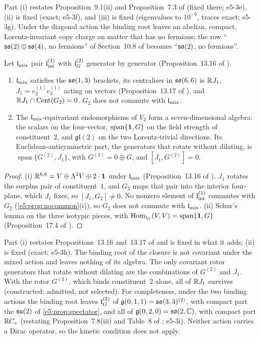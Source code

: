 Part (i) restates Proposition~9.1(ii) and Proposition~7.3 of \cite{RE} (fixed there; e5-3e), (ii) is fixed (exact; e5-3f), and (iii) is fixed
(eigenvalues to $10^{-9}$, traces exact; e5-3g). Under the diagonal action the binding root leaves an abelian, compact, Lorentz-invariant copy charge
on matter that has no fermions; the row ``$\mathfrak{so}(2)\oplus\mathfrak{so}(4)$, no fermions'' of Section~10.8 of \cite{ES17} becomes ``$\mathfrak{so}(2)$, no fermions''.

\begin{proposition}
\label{e5:prop:mixed}
Let $\mathfrak l_{\rm mix}$ pair $\mathfrak l_{\rm int}^{(1)}$ with $\mathfrak l_G^{(2)}$ generator by generator (Proposition~13.16 of \cite{ES17}).
\begin{enumerate}[label=(\roman*),leftmargin=2.2em]
\item $\mathfrak l_{\rm mix}$ satisfies the $\mathfrak{so}(1,3)$ brackets, its centraliser in $\mathfrak{so}(6,6)$ is $\mathbb{R} J_1$, $J_1=e^{(1)}_2e^{(1)}_3$ acting on vectors
(Proposition~13.17 of \cite{ES17}), and $\mathbb{R} J_1\cap\operatorname{Cent}(G_2)=0$. $G_2$ does not commute with $\mathfrak l_{\rm mix}$.
\item The $\mathfrak l_{\rm mix}$-equivariant endomorphisms of $V_2$ form a seven-dimensional algebra: the scalars on the four-vector, $\operatorname{span}\{\mathbf 1,G\}$ on
the field strength of constituent~$2$, and $\mathfrak{gl}(2)$ on the two Lorentz-trivial directions. Its Euclidean-antisymmetric part, the generators
that rotate without dilating, is $\operatorname{span}\{G^{(2)},J_1\}$, with $G^{(2)}=0\oplus G$, and $[J_1,G^{(2)}]=0$.
\end{enumerate}
\end{proposition}

\begin{proof}
(i) $\mathbb{R}^{6,6}=V\oplus\Lambda^2V\oplus2\cdot\mathbf1$ under $\mathfrak l_{\rm mix}$ (Proposition~13.16 of \cite{ES17}). $J_1$ rotates the surplus pair of
constituent~$1$, and $G_2$ maps that pair into the interior four-plane, which $J_1$ fixes, so $[J_1,G_2]\neq0$. No nonzero element of
$\mathfrak l_{\rm int}^{(1)}$ commutes with $G_2$ (\cref{e5:prop:nocommon}(i)), so $G_2$ does not commute with $\mathfrak l_{\rm mix}$. (ii) Schur's lemma on the three isotypic pieces, with $\operatorname{Hom}_{\mathfrak l_G}(V,V)=\operatorname{span}\{\mathbf 1,G\}$
(Proposition~17.4 of \cite{ES17}).
\end{proof}

Part (i) restates Propositions~13.16 and~13.17 of \cite{ES17} and is fixed in what it adds; (ii) is fixed (exact; e5-3h). The binding root of the
closure is not covariant under the mixed action and leaves nothing of its algebra. The only covariant rotor generators that rotate without
dilating are the combinations of $G^{(2)}$ and $J_1$. With the rotor $G^{(2)}$, which binds constituent~$2$ alone, all of $\mathbb{R} J_1$ survives
(constructed: admitted, not selected). For completeness, under the two binding actions the binding root leaves $\mathfrak l_G^{(2)}$ of
$\mathfrak g(0,1,1)=\mathfrak{so}(3,3)^{(2)}$, with compact part the $\mathfrak{su}(2)$ of \cref{e5:prop:spectator}, and all of $\mathfrak g(0,2,0)=\mathfrak{so}(2,\mathbb{C})$, with compact part
$\mathbb{R} C_v$ (restating Proposition~7.8(iii) and Table~8 of \cite{RE}; e5-3i). Neither action carries a Dirac operator, so the kinetic condition does
not apply.

